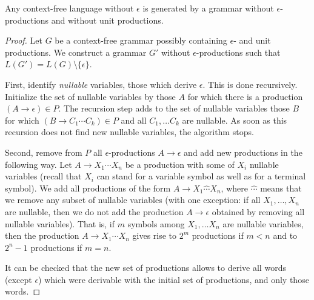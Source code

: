 \begin{page}
\setcounter{section}{5}
\setcounter{subsection}{2}
\setcounter{dfn}{8}
\label{portion:1097}

\begin{lem}
\label{lem:NoENoUnit}
Any context-free language without $\epsilon$ is generated by a grammar without $\epsilon$-productions and without unit productions.
\end{lem}

\end{page}

\begin{page}
\setcounter{section}{5}
\setcounter{subsection}{2}
\setcounter{dfn}{8}
\label{portion:1098}

\begin{proof}
Let $G$ be a context-free grammar possibly containing $\epsilon$- and unit productions.
We construct a grammar $G'$ without $\epsilon$-productions such that $L(G') = L(G) \setminus \{\epsilon\}$.

First, identify \emph{nullable} variables, those which derive $\epsilon$.
This is done recursively.
Initialize the set of nullable variables by those $A$ for which there is a production $(A \to \epsilon) \in P$.
The recursion step adds to the set of nullable variables those $B$ for which $(B \to C_1 \cdots C_k) \in P$
and all $C_1, \ldots C_k$ are nullable.
As soon as this recursion does not find new nullable variables, the algorithm stops.

Second, remove from $P$ all $\epsilon$-productions $A \to \epsilon$ and add new productions in the following way.
Let $A \to X_1 \cdots X_n$ be a production with some of $X_i$ nullable variables
(recall that $X_i$ can stand for a variable symbol as well as for a terminal symbol).
We add all productions of the form $A \to X_1 \widehat{\cdots} X_n$,
where $\widehat{\cdots}$ means that we remove any subset of nullable variables
(with one exception: if all $X_1, \ldots, X_n$ are nullable,
then we do not add the production $A \to \epsilon$ obtained by removing all nullable variables).
That is, if $m$ symbols among $X_1, \ldots X_n$ are nullable variables, then the production $A \to X_1 \cdots X_n$
gives rise to $2^m$ productions if $m < n$ and to $2^n - 1$ productions if $m=n$.

It can be checked that the new set of productions allows to derive all words (except $\epsilon$) which were derivable
with the initial set of productions, and only those words.


\end{proof}
\end{page}
